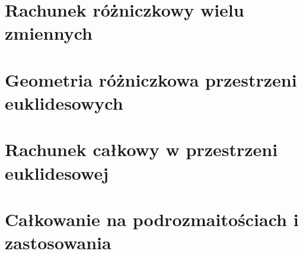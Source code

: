 \documentclass[11pt,a4paper,oneside,openany]{book}
\theoremstyle{plain}
\theoremstyle{definition}
\theoremstyle{remark}
\begin{document}
\part{Rachunek różniczkowy wielu zmiennych}












\part{Geometria różniczkowa przestrzeni euklidesowych}



\part{Rachunek całkowy w przestrzeni euklidesowej}





\part{Całkowanie na podrozmaitościach i zastosowania}






\end{document}
